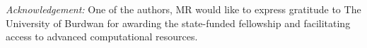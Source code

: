 \documentclass[%
reprint,
superscriptaddress,
amsmath,amssymb,
aps,
prb,
]{revtex4-2}
\begin{document}
	
	{\it Acknowledgement:}
	One of the authors, MR would like to express gratitude to The University of Burdwan for awarding the state-funded fellowship and facilitating access to advanced computational resources.
	
	
	
	\nocite{*}
	
	
\end{document}

